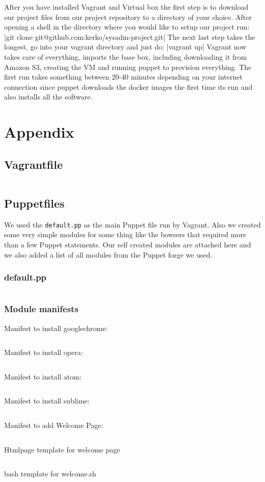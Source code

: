 After you have installed Vagrant and Virtual box the first step is to download our project files from our project repository to a directory of your choice. After opening a shell in the directory where you would like to setup our project run: |git clone git@github.com:kerko/sysadm-project.git|
The next last step takes the longest, go into your vagrant directory and just do: |vagrant up| Vagrant now takes care of everything, imports the base box, including downloading it from Amazon S3, creating the \gls{VM} and running puppet to provision everything. The first run takes something between 20-40 minutes depending on your internet connection since puppet downloads the docker images the first time its run and also installs all the software.




\cleardoublepage{}
\section{Appendix}
\subsection{Vagrantfile}
\inputminted[linenos=true]{ruby}{../../Vagrant/Vagrantfile}
\subsection{Puppetfiles}
We used the \verb|default.pp| as the main Puppet file run by Vagrant. Also we created some very simple modules for some thing like the bowsers that required more than a few Puppet statements. Our self created modules are attached here and we also added a list of all modules from the Puppet forge we used.
\subsubsection{default.pp}
\inputminted[linenos=true]{Puppet}{../../Puppet/manifests/default.pp}
\subsubsection{Module manifests}
Manifest to install googlechrome:
\inputminted[linenos=true]{Puppet}{../../Puppet/modules/googlechrome/manifests/init.pp}
Manifest to install opera:
\inputminted[linenos=true]{Puppet}{../../Puppet/modules/opera/manifests/init.pp}
Manifest to install atom:
\inputminted[linenos=true]{Puppet}{../../Puppet/modules/atom/manifests/init.pp}
Manifest to install sublime:
\inputminted[linenos=true]{Puppet}{../../Puppet/modules/sublime/manifests/init.pp}
Manifest to add Welcome Page:
\inputminted[linenos=true]{Puppet}{../../Puppet/modules/welcome/manifests/init.pp}
Htmlpage template for welcome page
\inputminted[linenos=true]{Html}{../../Puppet/modules/welcome/templates/welcomePage.html}
bash template for welcome.sh
\inputminted[linenos=true]{bash}{../../Puppet/modules/welcome/templates/welcomeScript.sh}


